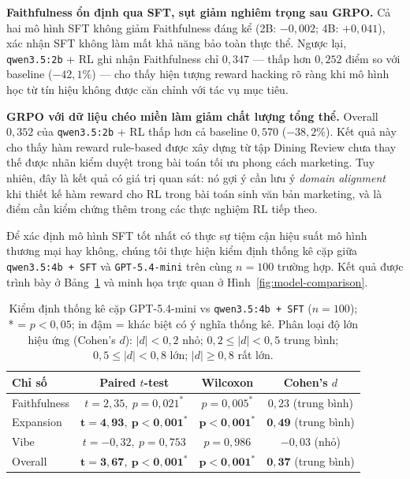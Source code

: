 \textbf{Faithfulness ổn định qua SFT, sụt giảm nghiêm trọng sau GRPO.}
Cả hai mô hình SFT không giảm Faithfulness đáng kể (2B: $-0{,}002$;
4B: $+0{,}041$), xác nhận SFT không làm mất khả năng bảo toàn thực thể.
Ngược lại, \texttt{qwen3.5:2b} + RL ghi nhận Faithfulness chỉ $0{,}347$
--- thấp hơn $0{,}252$ điểm so với baseline ($-42{,}1\%$) --- cho thấy
hiện tượng reward hacking rõ ràng khi mô hình học từ tín hiệu không
được căn chỉnh với tác vụ mục tiêu.

\textbf{GRPO với dữ liệu chéo miền làm giảm chất lượng tổng thể.}
Overall $0{,}352$ của \texttt{qwen3.5:2b} + RL thấp hơn cả baseline
$0{,}570$ ($-38{,}2\%$). Kết quả này cho thấy hàm reward rule-based
được xây dựng từ tập Dining Review chưa thay thế được nhãn kiểm duyệt
trong bài toán tối ưu phong cách marketing. Tuy nhiên, đây là kết quả
có giá trị quan sát: nó gợi ý cần lưu ý \emph{domain alignment} khi
thiết kế hàm reward cho RL trong bài toán sinh văn bản marketing, và
là điểm cần kiểm chứng thêm trong các thực nghiệm RL tiếp theo.

Để xác định mô hình SFT tốt nhất có thực sự tiệm cận hiệu suất mô hình
thương mại hay không, chúng tôi thực hiện kiểm định thống kê cặp giữa
\texttt{qwen3.5:4b + SFT} và \texttt{GPT-5.4-mini} trên cùng $n = 100$
trường hợp. Kết quả được trình bày ở Bảng~\ref{tab:statistical_test}
và minh họa trực quan ở Hình~\ref{fig:model-comparison}.

\begin{table}[ht]
  \centering
  \small
  \caption{Kiểm định thống kê cặp GPT-5.4-mini vs \texttt{qwen3.5:4b + SFT} ($n=100$); * = $p < 0{,}05$; in đậm = khác biệt có ý nghĩa thống kê. Phân loại độ lớn hiệu ứng (Cohen's $d$): $|d|<0{,}2$ nhỏ; $0{,}2 \leq |d| < 0{,}5$ trung bình; $0{,}5 \leq |d| < 0{,}8$ lớn; $|d| \geq 0{,}8$ rất lớn.}
  \label{tab:statistical_test}
  \begin{tabular}{lccc}
    \toprule
    \textbf{Chỉ số} & \textbf{Paired $t$-test} & \textbf{Wilcoxon}
      & \textbf{Cohen's $d$} \\
    \midrule
    Faithfulness
      & $t=2{,}35,\ p=0{,}021^{*}$
      & $p=0{,}005^{*}$
      & $0{,}23$ (trung bình) \\
    Expansion
      & $\mathbf{t=4{,}93,\ p<0{,}001^{*}}$
      & $\mathbf{p<0{,}001^{*}}$
      & $\mathbf{0{,}49}$ (trung bình) \\
    Vibe
      & $t=-0{,}32,\ p=0{,}753$
      & $p=0{,}986$
      & $-0{,}03$ (nhỏ) \\
    Overall
      & $\mathbf{t=3{,}67,\ p<0{,}001^{*}}$
      & $\mathbf{p<0{,}001^{*}}$
      & $\mathbf{0{,}37}$ (trung bình) \\
    \bottomrule
  \end{tabular}
\end{table}

